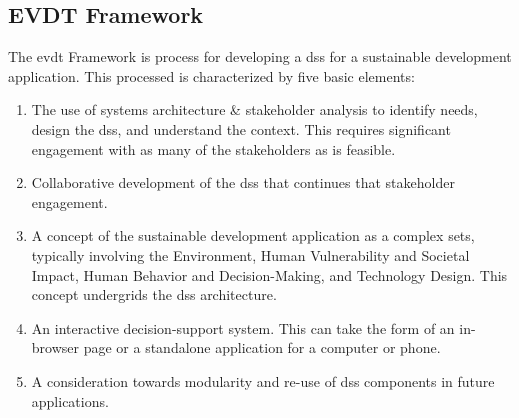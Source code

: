 \documentclass[notitlepage]{article}
\begin{document}
\subsection{EVDT Framework} \label{sec:evdt}

\color{OliveGreen}

The \ac{evdt} Framework is process for developing a \ac{dss} for a sustainable development application. This processed is characterized by five basic elements: 

\begin{enumerate} \setlength{\itemsep}{0pt} \setlength{\parskip}{0pt}
	\item{The use of systems architecture \& stakeholder analysis to identify needs, design the \ac{dss}, and understand the context. This requires significant engagement with as many of the stakeholders as is feasible.}
	\item{Collaborative development of the \ac{dss} that continues that stakeholder engagement.}
	\item{A concept of the sustainable development application as a complex \ac{sets}, typically involving the Environment, Human Vulnerability and Societal Impact, Human Behavior and Decision-Making, and Technology Design.} This concept undergrids the \ac{dss} architecture. \label{item:evdt}
	\item{An interactive decision-support system. This can take the form of an in-browser page or a standalone application for a computer or phone.}
	\item{A consideration towards modularity and re-use of \ac{dss} components in future applications.}
\end{enumerate}
\end{document}
